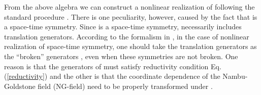 \documentclass[a4paper,12pt]{article}
\begin{document}
From the above algebra 
we can construct a nonlinear realization of \coordHE{} following the standard
procedure \cite{Weinberg}.
There is one peculiarity, however, caused by the fact 
that \coordHE{} is a space-time symmetry.
Since \coordHE{} is a space-time symmetry, \coordHE{}
necessarily includes translation generators.
According to the formalism in \cite{Ogievetsky}, 
in the case of nonlinear realization
of space-time symmetry, one should take the translation generators
as the ``broken'' generators \coordHE{},
even when these symmetries are not broken.
One reason is that the generators of \coordHE{} must satisfy reductivity
condition Eq. (\ref{reductivity}) and the other is that the
coordinate dependence of the Nambu-Goldstone field (NG-field)
need to be properly transformed under \coordHE{}.
\end{document}
